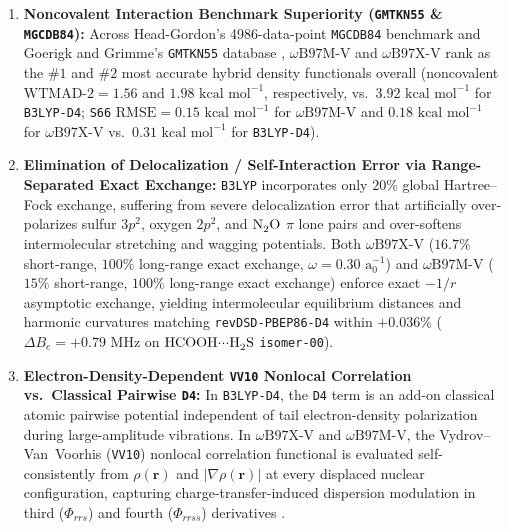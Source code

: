 \documentclass[journal=jpclcd,manuscript=article]{achemso}
\begin{document}
\begin{enumerate}
  \item \textbf{Noncovalent Interaction Benchmark Superiority (\texttt{GMTKN55} \& \texttt{MGCDB84}):} Across Head-Gordon's 4986-data-point \texttt{MGCDB84} benchmark \cite{Mardirossian2014, Mardirossian2016, Mardirossian2017} and Goerigk and Grimme's \texttt{GMTKN55} database \cite{Goerigk2017, Najibi2018}, $\omega\text{B97M-V}$ and $\omega\text{B97X-V}$ rank as the $\#1$ and $\#2$ most accurate hybrid density functionals overall (noncovalent $\mathrm{WTMAD\text{-}2} = 1.56$ and $1.98\text{ kcal mol}^{-1}$, respectively, vs.\ $3.92\text{ kcal mol}^{-1}$ for \texttt{B3LYP-D4}; \texttt{S66} $\mathrm{RMSE} = 0.15\text{ kcal mol}^{-1}$ for $\omega\text{B97M-V}$ and $0.18\text{ kcal mol}^{-1}$ for $\omega\text{B97X-V}$ vs.\ $0.31\text{ kcal mol}^{-1}$ for \texttt{B3LYP-D4}).
  \item \textbf{Elimination of Delocalization / Self-Interaction Error via Range-Separated Exact Exchange:} \texttt{B3LYP} incorporates only $20\%$ global Hartree--Fock exchange, suffering from severe delocalization error that artificially over-polarizes sulfur $3p^2$, oxygen $2p^2$, and $\ce{N2O}$ $\pi$ lone pairs and over-softens intermolecular stretching and wagging potentials. Both $\omega\text{B97X-V}$ ($16.7\%$ short-range, $100\%$ long-range exact exchange, $\omega = 0.30\text{ a}_0^{-1}$) \cite{Mardirossian2014} and $\omega\text{B97M-V}$ ($15\%$ short-range, $100\%$ long-range exact exchange) \cite{Mardirossian2016} enforce exact $-1/r$ asymptotic exchange, yielding intermolecular equilibrium distances and harmonic curvatures matching \texttt{revDSD-PBEP86-D4} within $+0.036\%$ ($\Delta B_e = +0.79\text{ MHz}$ on $\ce{HCOOH\bond{...}H2S}$ \texttt{isomer-00}).
  \item \textbf{Electron-Density-Dependent \texttt{VV10} Nonlocal Correlation vs.\ Classical Pairwise \texttt{D4}:} In \texttt{B3LYP-D4}, the \texttt{D4} term is an add-on classical atomic pairwise potential independent of tail electron-density polarization during large-amplitude vibrations. In $\omega\text{B97X-V}$ and $\omega\text{B97M-V}$, the Vydrov--Van~Voorhis (\texttt{VV10}) nonlocal correlation functional \cite{Vydrov2010} is evaluated self-consistently from $\rho(\mathbf{r})$ and $|\nabla\rho(\mathbf{r})|$ at every displaced nuclear configuration, capturing charge-transfer-induced dispersion modulation in third ($\Phi_{rrs}$) and fourth ($\Phi_{rrss}$) derivatives \cite{Brauer2016}.

\end{enumerate}
\end{document}
